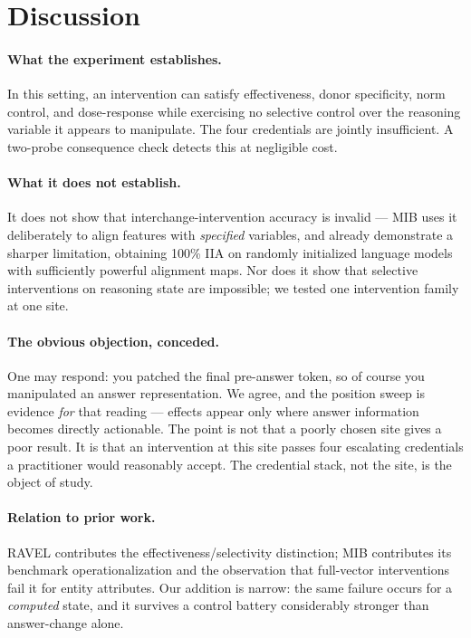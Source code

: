 \documentclass[11pt]{article}
\begin{document}
\section{Discussion}
\label{sec:discussion}

\paragraph{What the experiment establishes.}
In this setting, an intervention can satisfy effectiveness, donor specificity,
norm control, and dose-response while exercising no selective control over the
reasoning variable it appears to manipulate. The four credentials are jointly
insufficient. A two-probe consequence check detects this at negligible cost.

\paragraph{What it does not establish.}
It does not show that interchange-intervention accuracy is invalid --- MIB
uses it deliberately to align features with \emph{specified} variables, and
\citet{sutter2025nonlinear} already demonstrate a sharper limitation,
obtaining 100\% IIA on randomly initialized language models with sufficiently
powerful alignment maps. Nor does it show that selective interventions on
reasoning state are impossible; we tested one intervention family at one site.

\paragraph{The obvious objection, conceded.}
One may respond: you patched the final pre-answer token, so of course you
manipulated an answer representation. We agree, and the position sweep is
evidence \emph{for} that reading --- effects appear only where answer
information becomes directly actionable. The point is not that a poorly chosen
site gives a poor result. It is that an intervention at this site passes four
escalating credentials a practitioner would reasonably accept. The credential
stack, not the site, is the object of study.

\paragraph{Relation to prior work.}
RAVEL contributes the effectiveness/selectivity distinction; MIB contributes
its benchmark operationalization and the observation that full-vector
interventions fail it for entity attributes. Our addition is narrow: the same
failure occurs for a \emph{computed} state, and it survives a control battery
considerably stronger than answer-change alone.
\end{document}
